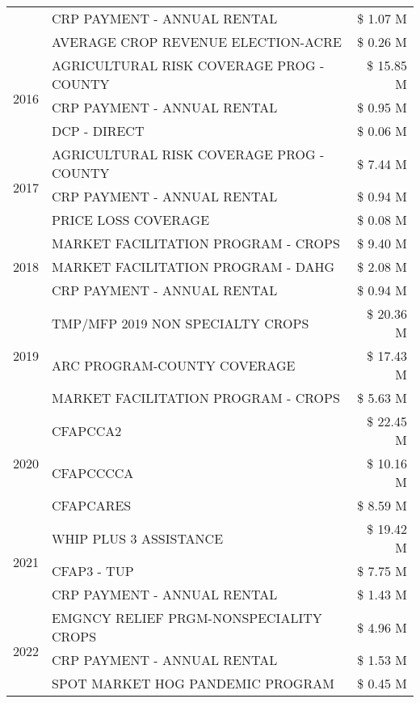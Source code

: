 \begin{tabular}{llr}
 & CRP PAYMENT - ANNUAL RENTAL & \$ 1.07 M \\
 & AVERAGE CROP REVENUE ELECTION-ACRE & \$ 0.26 M \\
\cline{1-3}
\multirow[t]{3}{*}{2016} & AGRICULTURAL RISK COVERAGE PROG - COUNTY & \$ 15.85 M \\
 & CRP PAYMENT - ANNUAL RENTAL & \$ 0.95 M \\
 & DCP - DIRECT & \$ 0.06 M \\
\cline{1-3}
\multirow[t]{3}{*}{2017} & AGRICULTURAL RISK COVERAGE PROG - COUNTY & \$ 7.44 M \\
 & CRP PAYMENT - ANNUAL RENTAL & \$ 0.94 M \\
 & PRICE LOSS COVERAGE & \$ 0.08 M \\
\cline{1-3}
\multirow[t]{3}{*}{2018} & MARKET FACILITATION PROGRAM - CROPS & \$ 9.40 M \\
 & MARKET FACILITATION PROGRAM - DAHG & \$ 2.08 M \\
 & CRP PAYMENT - ANNUAL RENTAL & \$ 0.94 M \\
\cline{1-3}
\multirow[t]{3}{*}{2019} & TMP/MFP 2019 NON SPECIALTY CROPS & \$ 20.36 M \\
 & ARC PROGRAM-COUNTY COVERAGE & \$ 17.43 M \\
 & MARKET FACILITATION PROGRAM - CROPS & \$ 5.63 M \\
\cline{1-3}
\multirow[t]{3}{*}{2020} & CFAPCCA2 & \$ 22.45 M \\
 & CFAPCCCCA & \$ 10.16 M \\
 & CFAPCARES & \$ 8.59 M \\
\cline{1-3}
\multirow[t]{3}{*}{2021} & WHIP PLUS 3 ASSISTANCE & \$ 19.42 M \\
 & CFAP3 - TUP & \$ 7.75 M \\
 & CRP PAYMENT - ANNUAL RENTAL & \$ 1.43 M \\
\cline{1-3}
\multirow[t]{3}{*}{2022} & EMGNCY RELIEF PRGM-NONSPECIALITY CROPS & \$ 4.96 M \\
 & CRP PAYMENT - ANNUAL RENTAL & \$ 1.53 M \\
 & SPOT MARKET HOG PANDEMIC PROGRAM & \$ 0.45 M \\
\cline{1-3}
\bottomrule
\end{tabular}
